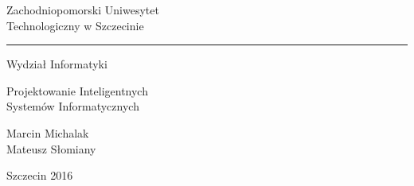 \begin{titlepage}
\centering
{\Huge Zachodniopomorski Uniwesytet\\Technologiczny w Szczecinie}
\rule{\linewidth}{0.4pt}
\par\vspace{1cm}
{\Large Wydział Informatyki}
\par\vspace{3cm}
{\Huge Projektowanie Inteligentnych\\Systemów Informatycznych}
\par\vspace{0.5cm}{\Large Projekt systemu agentowego}
\par{}
\par\vspace{5cm}
\raggedright Marcin Michalak\\Mateusz Słomiany
\par\vfill
\centering
{\Large Szczecin 2016}
\end{titlepage}